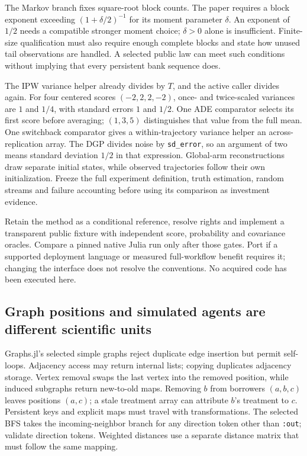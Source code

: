 The Markov branch fixes square-root block counts. The paper requires a block
exponent exceeding $(1+\delta/2)^{-1}$ for its moment parameter $\delta$.
An exponent of $1/2$ needs a compatible stronger moment choice; $\delta>0$
alone is insufficient. Finite-size qualification must also require enough
complete blocks and state how unused tail observations are handled. A selected
public law can meet such conditions without implying that every persistent
bank sequence does.~\citep{exec25_onet_dml,exec25_onet_paper}

The IPW variance helper already divides by $T$, and the active caller divides
again. For four centered scores $(-2,2,2,-2)$, once- and twice-scaled variances
are $1$ and $1/4$, with standard errors $1$ and $1/2$. One ADE comparator
selects its first score before averaging; $(1,3,5)$ distinguishes that value
from the full mean. One switchback comparator gives a within-trajectory
variance helper an across-replication array. The DGP divides noise by
\texttt{sd\_error}, so an argument of two means standard deviation $1/2$
in that expression. Global-arm reconstructions draw separate initial states,
while observed trajectories follow their own initialization. Freeze the full
experiment definition, truth estimation, random streams and failure accounting
before using its comparison as investment evidence.
\citep{exec25_onet_dml,exec25_onet_choice}

Retain the method as a conditional reference, resolve rights and implement a
transparent public fixture with independent score, probability and covariance
oracles. Compare a pinned native Julia run only after those gates. Port if a
supported deployment language or measured full-workflow benefit requires it;
changing the interface does not resolve the conventions. No acquired code has
been executed here.~\citep{exec25_onet_choice}

\subsection{Graph positions and simulated agents are different scientific units}

Graphs.jl's selected simple graphs reject duplicate edge insertion but permit
self-loops. Adjacency access may return internal lists; copying duplicates
adjacency storage. Vertex removal swaps the last vertex into the removed
position, while induced subgraphs return new-to-old maps. Removing $b$ from
borrowers $(a,b,c)$ leaves positions $(a,c)$; a stale treatment array can
attribute $b$'s treatment to $c$. Persistent keys and explicit maps must travel
with transformations. The selected BFS takes the incoming-neighbor branch
for any direction token other than \texttt{:out}; validate direction tokens.
Weighted distances use a separate distance matrix that must follow the same
mapping.~\citep{exec25_onet_graphs,exec25_onet_choice}

